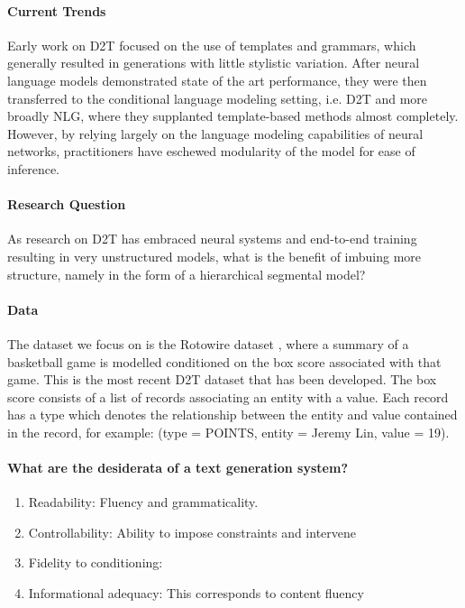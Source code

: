 \documentclass[11pt]{article}
\begin{document}
\paragraph{Current Trends}
Early work on D2T focused on the use of templates and grammars, 
which generally resulted in generations with little stylistic variation.
After neural language models demonstrated state of the art performance,
they were then transferred to the conditional language modeling setting,
i.e. D2T and more broadly NLG,
where they supplanted template-based methods almost completely.
However, by relying largely on the language modeling capabilities of neural networks,
practitioners have eschewed modularity of the model for ease of inference.

\paragraph{Research Question}
As research on D2T has embraced neural systems and end-to-end training resulting
in very unstructured models, what is the benefit of imbuing more structure, namely in the
form of a hierarchical segmental model?


\paragraph{Data}
The dataset we focus on is the Rotowire dataset \citep{wiseman2017d2t},
where a summary of a basketball game is modelled conditioned on the box score
associated with that game.
This is the most recent D2T dataset that has been developed.
The box score consists of a list of records associating an entity with a value.
Each record has a type which denotes the relationship between the entity and value
contained in the record,
for example: (type = POINTS, entity = Jeremy Lin, value = 19).

\paragraph{What are the desiderata of a text generation system?}
\begin{enumerate}
\item Readability: Fluency and grammaticality.
\item Controllability: Ability to impose constraints and intervene
\item Fidelity to conditioning: 
\item Informational adequacy: This corresponds to content fluency
\end{enumerate}
\end{document}
